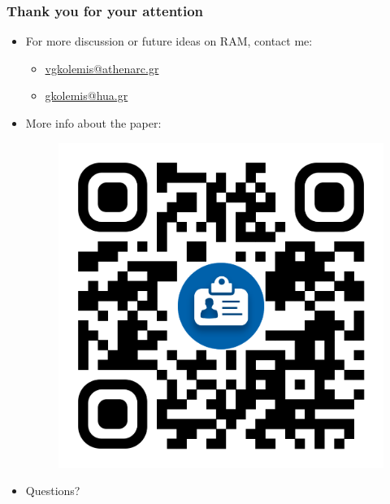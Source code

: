 \documentclass{beamer}
\begin{document}
\begin{frame}
  \frametitle{Thank you for your attention}
  \begin{itemize}
  \item For more discussion or future ideas on RAM, contact me:
    \begin{itemize}
    \item \href{vgkolemis@athenarc.gr}{vgkolemis@athenarc.gr}
    \item \href{gkolemis@hua.gr}{gkolemis@hua.gr}
    \end{itemize}
  \item More info about the paper:
\begin{figure}[htbp]
  \centering
  \includegraphics[width=.2\textwidth]{figures/publications}
\end{figure}
  \item Questions?
  \end{itemize}


\end{frame}



\end{document}
